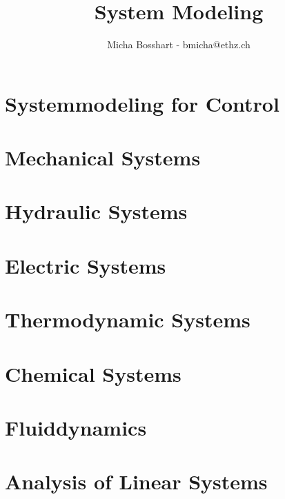 \documentclass[8pt, a4paper]{mpscheatsheet}
\title{System Modeling}
\author{Micha Bosshart - bmicha@ethz.ch}
\begin{document}
    \section{Systemmodeling for Control}
        
        
        
    \section{Mechanical Systems}
        
        
        
    \section{Hydraulic Systems}
        
        \vfill \null \columnbreak
    \section{Electric Systems}
        
    \section{Thermodynamic Systems}
        
    \section{Chemical Systems}
        
        \vfill \null \columnbreak
    \section{Fluiddynamics}
        
        \vfill \null \columnbreak
    \section{Analysis of Linear Systems}
        

    
\end{document}
